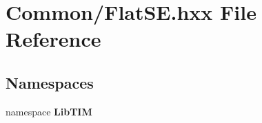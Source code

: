 \section{Common/Flat\-SE.hxx File Reference}
\label{FlatSE_8hxx}
\subsection*{Namespaces}
\begin{CompactItemize}
\item 
namespace {\bf Lib\-TIM}
\end{CompactItemize}
